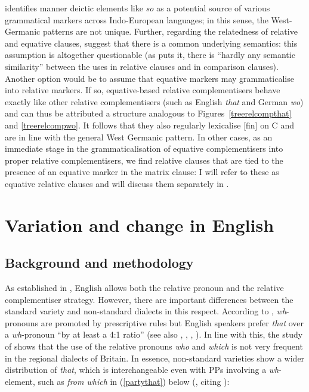 \citet{koenig2015} identifies manner deictic elements like \textit{so} as a potential source of various grammatical markers across Indo-European languages; in this sense, the West-Germanic patterns are not unique. Further, regarding the relatedness of relative and equative clauses, \citet{brandnerbraeuning2013} suggest that there is a common underlying semantics: this assumption is altogether questionable (as \citealt[54]{koenig2015} puts it, there is ``hardly any semantic similarity'' between the uses in relative clauses and in comparison clauses). Another option would be to assume that equative markers may grammaticalise into relative markers. If so, equative-based relative complementisers behave exactly like other relative complementisers (such as English \textit{that} and German \textit{wo}) and can thus be attributed a structure analogous to Figures~\ref{treerelcompthat} and \ref{treerelcompwo}. It follows that they also regularly lexicalise [fin] on C and are in line with the general West Germanic pattern. In other cases, as an immediate stage in the grammaticalisation of equative complementisers into proper relative complementisers, we find relative clauses that are tied to the presence of an equative marker in the matrix clause: I will refer to these as equative relative clauses and will discuss them separately in .

\section{Variation and change in English} \label{sec:4variation}
\subsection{Background and methodology} \label{sec:4background}
As established in , English allows both the relative pronoun and the relative complementiser strategy. However, there are important differences between the standard variety and non-standard dialects in this respect. According to \citet[163]{vangelderen2009}, \textit{wh}-pronouns are promoted by prescriptive rules but English speakers prefer \textit{that} over a \textit{wh}-pronoun ``by at least a 4:1 ratio'' (see also \citealt{romaine1982}, \citealt{montgomerybailey1991}, \citealt{vangelderen2004}, \citealt{tagliamontesmithlawrence2005}). In line with this, the study of \citet{herrmann2005} shows that the use of the relative pronouns \textit{who} and \textit{which} is not very frequent in the regional dialects of Britain. In essence, non-standard varieties show a wider distribution of \textit{that}, which is interchangeable even with PPs involving a \textit{wh}-element, such as \textit{from which} in (\ref{partythat}) below (\citealt[161, ex. 8]{vangelderen2009}, citing \citealt[112]{miller1993}):


